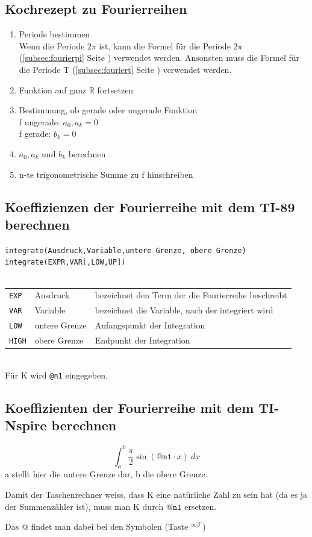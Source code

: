 \subsection{Kochrezept zu Fourierreihen}
\begin{enumerate}
  \item Periode bestimmen\\
  Wenn die Periode $2\pi$ ist, kann die Formel für die Periode $2\pi$ (\ref{subsec:fourierpi} Seite \pageref{subsec:fourierpi}) verwendet werden. Ansonsten muss die Formel für die Periode T (\ref{subsec:fouriert} Seite \pageref{subsec:fouriert}) verwendet werden. 
  \item Funktion auf ganz $\mathbb{R}$ fortsetzen
  \item Bestimmung, ob gerade oder ungerade Funktion\\
  f ungerade: $a_0, a_k = 0$\\
  f gerade: $b_k = 0$
  \item $a_0, a_k$ und $b_k$ berechnen
  \item n-te trigonometrische Summe zu f hinschreiben
\end{enumerate}

\ifti
\subsection{Koeffizienzen der Fourierreihe mit dem TI-89 berechnen}
\verb?integrate(Ausdruck,Variable,untere Grenze, obere Grenze)? \\
\verb?integrate(EXPR,VAR[,LOW,UP])? \\\\
\begin{tabular}{@{}lll}
\verb?EXP?  & Ausdruck      & bezeichnet den Term der die Fourierreihe beschreibt \\
\verb?VAR?  & Variable      & bezeichnet die Variable, nach der integriert wird \\
\verb?LOW?  & untere Grenze & Anfangspunkt der Integration \\
\verb?HIGH? & obere Grenze  & Endpunkt der Integration \\
\end{tabular}\\
Für K wird \verb?@n1? eingegeben. 
\fi
\ifnspire
\subsection{Koeffizienten der Fourierreihe mit dem TI-Nspire berechnen}
\[ \int_{\boxed{a}}^{\boxed{b}}\boxed{\frac{\pi}{2}\sin(\mathtt{@n1} \cdot x)}~d\boxed{x} \]
a stellt hier die untere Grenze dar, b die obere Grenze.


Damit der Taschenrechner weiss, dass K eine natürliche Zahl zu sein hat (da es ja der Summenzähler ist), muss man K durch $\mathtt{@n1}$ ersetzen.


Das $\mathtt{@}$ findet man dabei bei den Symbolen (Taste $\boxed{\boxed{^{\infty \beta ^\circ}}}$)
\fi
